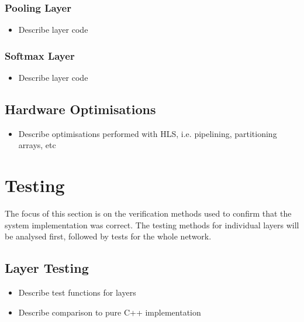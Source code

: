 \documentclass[12pt]{article}
\begin{document}
\subsubsection{Pooling Layer}
\label{sec:Imp-Layers-Pool}
\vspace{-12pt}

\begin{itemize}
\item Describe layer code
\end{itemize}

\subsubsection{Softmax Layer}
\label{sec:Imp-Layers-Prob}
\vspace{-12pt}

\begin{itemize}
\item Describe layer code
\end{itemize}

\subsection{Hardware Optimisations}
\label{sec:Imp-Optimisations}
\vspace{-12pt}

\begin{itemize}
\item Describe optimisations performed with HLS, i.e. pipelining, partitioning arrays, etc
\end{itemize}

\newpage

\section{Testing}
\label{sec:Test}
\vspace{-12pt}

The focus of this section is on the verification methods used to confirm that the system implementation was correct. The testing methods for individual layers will be analysed first, followed by tests for the whole network.

\subsection{Layer Testing}
\label{sec:Test-Layers}
\vspace{-12pt}

\begin{itemize}
\item Describe test functions for layers
\item Describe comparison to pure C++ implementation
\end{itemize}
\end{document}
